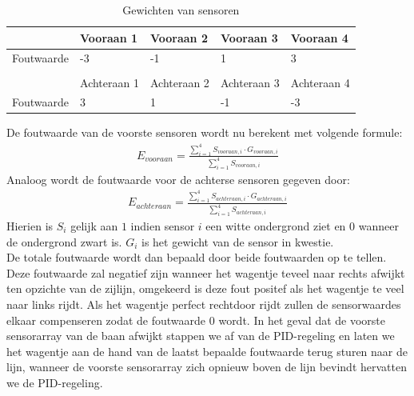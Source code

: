 \documentclass[11pt,a4paper]{report}
\begin{document}
\begin{table}[H]
	\centering
	\begin{tabular}{lllll}
		\hline
		\multicolumn{1}{|l|}{}           & \multicolumn{1}{l|}{Vooraan 1}   & \multicolumn{1}{l|}{Vooraan 2}   & \multicolumn{1}{l|}{Vooraan 3}   & \multicolumn{1}{l|}{Vooraan 4}   \\ \hline
		\multicolumn{1}{|l|}{Foutwaarde} & \multicolumn{1}{l|}{-3}          & \multicolumn{1}{l|}{-1}          & \multicolumn{1}{l|}{1}           & \multicolumn{1}{l|}{3}           \\ \hline
		&                                  &                                  &                                  &                                  \\ \hline
		\multicolumn{1}{|l|}{}           & \multicolumn{1}{l|}{Achteraan 1} & \multicolumn{1}{l|}{Achteraan 2} & \multicolumn{1}{l|}{Achteraan 3} & \multicolumn{1}{l|}{Achteraan 4} \\ \hline
		\multicolumn{1}{|l|}{Foutwaarde} & \multicolumn{1}{l|}{3}           & \multicolumn{1}{l|}{1}           & \multicolumn{1}{l|}{-1}          & \multicolumn{1}{l|}{-3}           \\ \hline
	\end{tabular}
	\caption{Gewichten van sensoren}
	\label{table:sensorgewicht}
\end{table}

De foutwaarde van de voorste sensoren wordt nu berekent met volgende formule:
\begin{gather*}
E_{vooraan} = \frac{\sum\limits_{i=1}^{4}S_{vooraan,i}\cdot G_{vooraan,i}}{\sum\limits_{i=1}^{4}S_{vooraan,i}}
\end{gather*}
Analoog wordt de foutwaarde voor de achterse sensoren gegeven door:
\begin{gather*}
E_{achteraan} = \frac{\sum\limits_{i=1}^{4}S_{achteraan,i}\cdot G_{achteraan,i}}{\sum\limits_{i=1}^{4}S_{achteraan,i}}
\end{gather*}
Hierien is $S_i$ gelijk aan $1$ indien sensor $i$ een witte ondergrond ziet en $0$ wanneer de ondergrond zwart is. $G_i$ is het gewicht van de sensor in kwestie.\\
De totale foutwaarde wordt dan bepaald door beide foutwaarden op te tellen. Deze foutwaarde zal negatief zijn wanneer het wagentje teveel naar rechts afwijkt ten opzichte van de zijlijn, omgekeerd is deze fout positef als het wagentje te veel naar links rijdt. Als het wagentje perfect rechtdoor rijdt zullen de sensorwaardes elkaar compenseren zodat de foutwaarde $0$ wordt. In het geval dat de voorste sensorarray van de baan afwijkt stappen we af van de PID-regeling en laten we het wagentje aan de hand van de laatst bepaalde foutwaarde terug sturen naar de lijn, wanneer de voorste sensorarray zich opnieuw boven de lijn bevindt hervatten we de PID-regeling.
\end{document}
